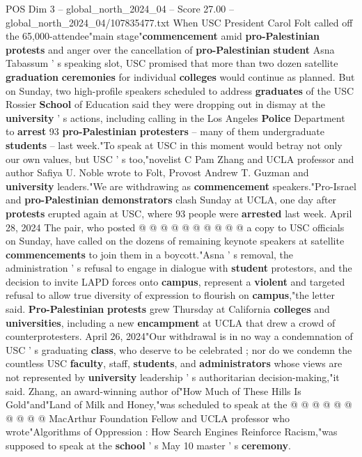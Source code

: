 \begin{textsample}{POS Dim 3 – global\_north\_2024\_04 – Score 27.00 – global\_north\_2024\_04/107835477.txt}  \label{ex:f3_pos_074}
When USC President Carol Folt called off the 65,000-attendee"main stage"\textbf{commencement} amid \textbf{pro-Palestinian} \textbf{protests} and anger over the cancellation of \textbf{pro-Palestinian} \textbf{student} Asna Tabassum ' s speaking slot, USC promised that more than two dozen satellite \textbf{graduation} \textbf{ceremonies} for individual \textbf{colleges} would continue as planned.
But on Sunday, two high-profile speakers scheduled to address \textbf{graduates} of the USC Rossier \textbf{School} of Education said they were dropping out in dismay at the \textbf{university} ' s actions, including calling in the Los Angeles \textbf{Police} Department to \textbf{arrest} 93 \textbf{pro-Palestinian} \textbf{protesters} -- many of them undergraduate \textbf{students} -- last week."To speak at USC in this moment would betray not only our own values, but USC ' s too,"novelist C Pam Zhang and UCLA professor and author Safiya U.
Noble wrote to Folt, Provost Andrew T.
Guzman and \textbf{university} leaders."We are withdrawing as \textbf{commencement} speakers."Pro-Israel and \textbf{pro-Palestinian} \textbf{demonstrators} clash Sunday at UCLA, one day after \textbf{protests} erupted again at USC, where 93 people were \textbf{arrested} last week.
April 28, 2024 The pair, who posted @ @ @ @ @ @ @ @ @ @ a copy to USC officials on Sunday, have called on the dozens of remaining keynote speakers at satellite \textbf{commencements} to join them in a boycott."Asna ' s removal, the administration ' s refusal to engage in dialogue with \textbf{student} protestors, and the decision to invite LAPD forces onto \textbf{campus}, represent a \textbf{violent} and targeted refusal to allow true diversity of expression to flourish on \textbf{campus},"the letter said. \textbf{Pro-Palestinian} \textbf{protests} grew Thursday at California \textbf{colleges} and \textbf{universities}, including a new \textbf{encampment} at UCLA that drew a crowd of counterprotesters.
April 26, 2024"Our withdrawal is in no way a condemnation of USC ' s graduating \textbf{class}, who deserve to be celebrated ; nor do we condemn the countless USC \textbf{faculty}, staff, \textbf{students}, and \textbf{administrators} whose views are not represented by \textbf{university} leadership ' s authoritarian decision-making,"it said.
Zhang, an award-winning author of"How Much of These Hills Is Gold"and"Land of Milk and Honey,"was scheduled to speak at the @ @ @ @ @ @ @ @ @ @ MacArthur Foundation Fellow and UCLA professor who wrote"Algorithms of Oppression : How Search Engines Reinforce Racism,"was supposed to speak at the \textbf{school} ' s May 10 master ' s \textbf{ceremony}.

\end{textsample}
